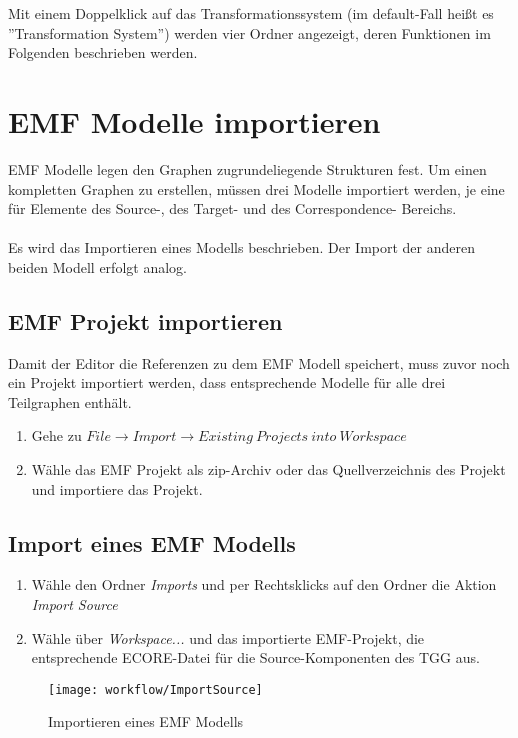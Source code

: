 		Mit einem Doppelklick auf das Transformationssystem (im default-Fall heißt es ''Transformation System'') 	
		werden vier Ordner angezeigt, deren Funktionen im Folgenden beschrieben werden.


	\section{EMF Modelle importieren}

	EMF Modelle legen den Graphen zugrundeliegende Strukturen fest. Um einen kompletten Graphen zu erstellen, 
	müssen drei Modelle importiert werden, je eine für Elemente des Source-, des Target- und des Correspondence-
	Bereichs.\\
	\\
	Es wird das Importieren eines Modells beschrieben. Der Import der anderen beiden Modell erfolgt analog.

	\subsection{EMF Projekt importieren}
	Damit der Editor die Referenzen zu dem EMF Modell speichert, muss zuvor noch ein Projekt importiert werden, 
	dass entsprechende Modelle für alle drei Teilgraphen enthält.
		\begin{enumerate}
			\item Gehe zu $File \rightarrow Import \rightarrow Existing\ Projects\ into\ Workspace$
			\item Wähle das EMF Projekt als zip-Archiv oder das Quellverzeichnis des Projekt und importiere das 
			Projekt.
		\end{enumerate}

	\subsection{Import eines EMF Modells}
		\begin{enumerate}
			\item Wähle den Ordner \textit{Imports} und per Rechtsklicks auf den Ordner die Aktion \textit{Import Source}
			\item Wähle über \textit{Workspace...} und das importierte EMF-Projekt, die entsprechende ECORE-Datei für
			 die Source-Komponenten des TGG aus.
		\end{enumerate}
		
		\begin{figure}[h!] %
			\centering
			\texttt{[image: workflow/ImportSource]}
			\caption{Importieren eines EMF Modells}
			\label{fig:importSource}
		\end{figure}		
		
